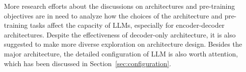 {    

More research efforts about the discussions on architectures and pre-training objectives are in need to analyze how the choices of the architecture and pre-training tasks affect the capacity of LLMs, especially for encoder-decoder architectures.  
Despite the effectiveness of decoder-only architecture, it is also suggested to make more diverse exploration on architecture design. 
Besides the major architecture, the detailed configuration of LLM is also worth attention, which has been discussed in Section~\ref{sec:configuration}. 








\begin{table}[htb]
    \centering
    \caption{Detailed optimization settings of several existing  LLMs. 
    }
\end{table}}
